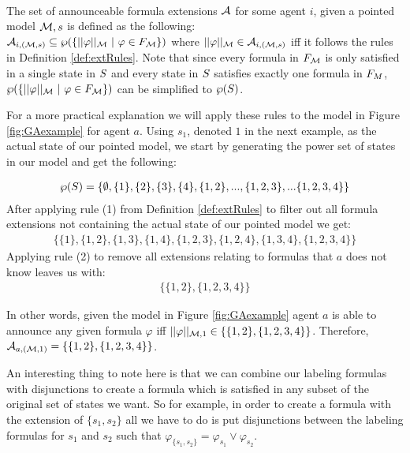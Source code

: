\begin{definition}\hfill\\
	\label{def:annexts}
	The set of announceable formula extensions $\mathcal{A}_{}$ for some agent $i$, given a pointed model $\mathcal{M},s$ is defined 			as the following: \\
	$\mathcal{A}_{i,(\mathcal{M},s)} \subseteq \wp(\{||\varphi||_{\mathcal{M}} ~|~ \varphi\in F_{\mathcal{M}}\})$ where $||\varphi||_{\mathcal{M}} \in 		     
	\mathcal{A}_{i,(\mathcal{M},s)}$ iff it follows the rules in Definition \ref{def:extRules}.
	Note that since every formula in $F_{\mathcal{M}}$ is only satisfied in a single state in $S$ and every state in $S$ satisfies exactly one formula in $F_{M}$, $\wp(\{||\varphi||_{\mathcal{M}} ~|~ \varphi \in F_{\mathcal{M}}\})$ can be simplified to $\wp(S)$.
\end{definition}

For a more practical explanation we will apply these rules to the model in Figure \ref{fig:GAexample} for agent $a$. Using $s_1$, denoted $1$ in the next example, as the actual state of our pointed model, we start by generating the power set of states in our model and get the following:

\begin{align*}
	\wp(S) = \{\emptyset,\{1\},\{2\},\{3\},\{4\},\{1,2\},...,\{1,2,3\},...\{1,2,3,4\}\}
\end{align*}
After applying rule (1) from Definition \ref{def:extRules}	to filter out all formula extensions not containing the actual state of our pointed model we get:
\begin{align*}
	\{\{1\},\{1,2\},\{1,3\},\{1,4\},\{1,2,3\},\{1,2,4\},\{1,3,4\},\{1,2,3,4\}\}
\end{align*}
Applying rule (2) to remove all extensions relating to formulas that $a$ does not know leaves us with:
\begin{align*}
	\{\{1,2\},\{1,2,3,4\}\}
\end{align*}

In other words, given the model in Figure \ref{fig:GAexample} agent $a$ is able to announce any given formula $\varphi$ iff $||\varphi||_{\mathcal{M},1} \in \{\{1,2\},\{1,2,3,4\}\}$. Therefore, $\mathcal{A}_{a,(\mathcal{M},1)} = \{\{1,2\},\{1,2,3,4\}\}$.

An interesting thing to note here is that we can combine our labeling formulas with disjunctions to create a formula which is satisfied in any subset of the original set of states we want. So for example, in order to create a formula with the extension of $\{s_1,s_2\}$ all we have to do is put disjunctions between the labeling formulas for $s_1$ and $s_2$ such that $\varphi_{\{s_1,s_2\}} = \varphi_{s_1} \vee \varphi_{s_2}$.

